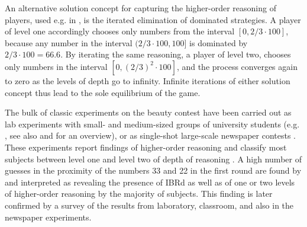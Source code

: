 \documentclass[12pt,review]{elsarticle}
\begin{document}
An alternative solution concept for capturing the higher-order reasoning of players, used e.g. in \citet{HoCamererWeigelt98}, is the iterated elimination of dominated strategies. A player of level one accordingly chooses only numbers from the interval $[0,2/3\cdot100]$, because any number in the interval $(2/3\cdot100,100]$ is dominated by $2/3\cdot100=66.6$.
By iterating the same reasoning, a player of level two, chooses only numbers in the interval $[0,(2/3)^{2}\cdot100]$, and the process converges again to zero as the levels of depth go to infinity. Infinite iterations of either solution concept thus lead to the sole equilibrium of the game.

The bulk of classic experiments on the beauty contest have been carried out as lab experiments with small- and medium-sized groups of university students (e.g. \citet{Nagel95, HoCamererWeigelt98}, see also \citet{CamererHoChong2004} and \citet{Nagel08Chapter} for an overview), or as single-shot large-scale newspaper contests \citep{bosch1997juego, schou2005gaet, selten1998zahlenwahlspiel, Thaler1997competition}. These experiments report findings of higher-order reasoning and classify most subjects between level one and level two of depth of reasoning \citep{NagelEtAl02, DuffyNagel97, HoCamererWeigelt98, Nagel95, Rapoport06, selten1998zahlenwahlspiel}. A high number of guesses in the proximity of the numbers 33 and 22 in the first round are found by \citet{Nagel95, selten1998zahlenwahlspiel} and interpreted as revealing the presence of IBRd as well as of one or two levels of higher-order reasoning by the majority of subjects. This finding is later confirmed by a survey of the results from laboratory, classroom, and also in the newspaper experiments.

\end{document}
